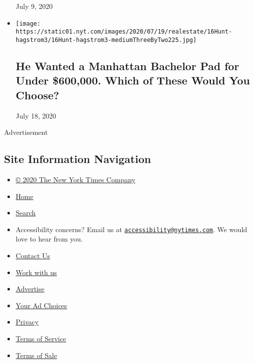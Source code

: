 \begin{itemize}
  July 9, 2020
\item
  \href{https://www.nytimes.com/interactive/2020/07/16/realestate/16hunt-hagstrom.html}{}

  \texttt{[image: https://static01.nyt.com/images/2020/07/19/realestate/16Hunt-hagstrom3/16Hunt-hagstrom3-mediumThreeByTwo225.jpg]}

  \hypertarget{he-wanted-a-manhattan-bachelor-pad-for-under-600000-which-of-these-would-you-choose}{%
  \subsection{He Wanted a Manhattan Bachelor Pad for Under \$600,000.
  Which of These Would You
  Choose?}\label{he-wanted-a-manhattan-bachelor-pad-for-under-600000-which-of-these-would-you-choose}}

  July 18, 2020
\end{itemize}

Advertisement

\hypertarget{site-information-navigation}{%
\subsection{Site Information
Navigation}\label{site-information-navigation}}

\begin{itemize}
\tightlist
\item
  \href{https://help.nytimes.com/hc/en-us/articles/115014792127-Copyright-notice}{©
  2020 The New York Times Company}
\item
  \href{https://www.nytimes.com}{Home}
\item
  \href{https://www.nytimes.com/search/}{Search}
\item
  Accessibility concerns? Email us at
  \href{mailto:accessibility@nytimes.com}{\nolinkurl{accessibility@nytimes.com}}.
  We would love to hear from you.
\item
  \href{https://help.nytimes.com/hc/en-us/articles/115015385887-Contact-Us}{Contact
  Us}
\item
  \href{https://www.nytco.com/careers/}{Work with us}
\item
  \href{https://nytmediakit.com/}{Advertise}
\item
  \href{https://help.nytimes.com/hc/en-us/articles/115014892108-Privacy-policy\#pp}{Your
  Ad Choices}
\item
  \href{https://help.nytimes.com/hc/en-us/articles/115014892108-Privacy-policy}{Privacy}
\item
  \href{https://help.nytimes.com/hc/en-us/articles/115014893428-Terms-of-service}{Terms
  of Service}
\item
  \href{https://help.nytimes.com/hc/en-us/articles/115014893968-Terms-of-sale}{Terms
  of Sale}
\end{itemize}

